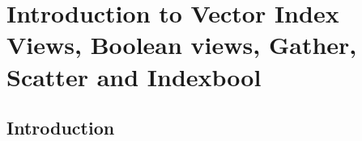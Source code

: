 \chapter{Introduction to Vector Index Views, Boolean views, Gather, Scatter and Indexbool}
\section*{Introduction}
